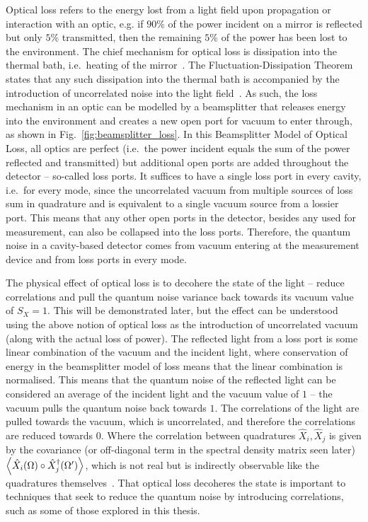 Optical loss refers to the energy lost from a light field upon propagation or interaction with an optic, e.g. if $90\%$ of the power incident on a mirror is reflected but only $5\%$ transmitted, then the remaining $5\%$ of the power has been lost to the environment. The chief mechanism for optical loss is dissipation into the thermal bath, i.e.\ heating of the mirror~\cite{}. The Fluctuation-Dissipation Theorem states that any such dissipation into the thermal bath is accompanied by the introduction of uncorrelated noise into the light field~\cite{}. As such, the loss mechanism in an optic can be modelled by a beamsplitter that releases energy into the environment and creates a new open port for vacuum to enter through, as shown in Fig.~\ref{fig:beamsplitter_loss}. In this Beamsplitter Model of Optical Loss, all optics are perfect (i.e.\ the power incident equals the sum of the power reflected and transmitted) but additional open ports are added throughout the detector -- so-called loss ports. It suffices to have a single loss port in every cavity, i.e.\ for every mode, since the uncorrelated vacuum from multiple sources of loss sum in quadrature and is equivalent to a single vacuum source from a lossier port. %
This means that any other open ports in the detector, besides any used for measurement, can also be collapsed into the loss ports. Therefore, the quantum noise in a cavity-based detector comes from vacuum entering at the measurement device and from loss ports in every mode.

The physical effect of optical loss is to decohere the state of the light -- reduce correlations and pull the quantum noise variance back towards its vacuum value of $S_X=1$. This will be demonstrated later, but the effect can be understood using the above notion of optical loss as the introduction of uncorrelated vacuum (along with the actual loss of power). The reflected light from a loss port is some linear combination of the vacuum and the incident light, where conservation of energy in the beamsplitter model of loss means that the linear combination is normalised. This means that the quantum noise of the reflected light can be considered an average of the incident light and the vacuum value of $1$ -- the vacuum pulls the quantum noise back towards $1$. The correlations of the light are pulled towards the vacuum, which is uncorrelated, and therefore the correlations are reduced towards $0$. Where the correlation between quadratures $\hat{X}_i, \hat{X}_j$ is given by the covariance (or off-diagonal term in the spectral density matrix seen later) $\ev{\hat{X}_i(\Omega)\circ\hat{X}_j^\dag(\Omega')}$, which is not real but is indirectly observable like the quadratures themselves~\cite{}. That optical loss decoheres the state is important to techniques that seek to reduce the quantum noise by introducing correlations, such as some of those explored in this thesis.


